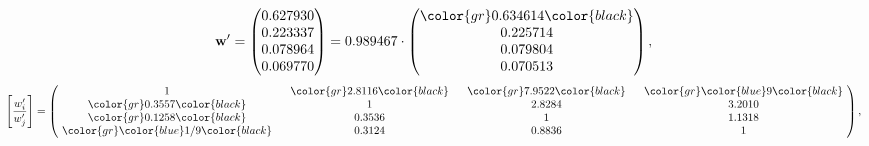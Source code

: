 \begin{example}
\begin{equation*}
\mathbf{w}^{\prime} =
\begin{pmatrix}
0.627930\\
0.223337\\
0.078964\\
0.069770
\end{pmatrix} =
0.989467\cdot
\begin{pmatrix}
\color{gr} 0.634614\color{black} \\
0.225714\\
0.079804\\
0.070513
\end{pmatrix},
\end{equation*}
\begin{equation*}
\left[ \frac{{w}^{\prime}_i}{{w}^{\prime}_j} \right] =
\begin{pmatrix}
$\,\,$ 1 $\,\,$ & $\,\,$\color{gr} 2.8116\color{black} $\,\,$ & $\,\,$\color{gr} 7.9522\color{black} $\,\,$ & $\,\,$\color{gr} \color{blue} 9\color{black} $\,\,$ \\
$\,\,$\color{gr} 0.3557\color{black} $\,\,$ & $\,\,$ 1 $\,\,$ & $\,\,$2.8284$\,\,$ & $\,\,$3.2010  $\,\,$ \\
$\,\,$\color{gr} 0.1258\color{black} $\,\,$ & $\,\,$0.3536$\,\,$ & $\,\,$ 1 $\,\,$ & $\,\,$1.1318 $\,\,$ \\
$\,\,$\color{gr} \color{blue}  1/9\color{black} $\,\,$ & $\,\,$0.3124$\,\,$ & $\,\,$0.8836$\,\,$ & $\,\,$ 1  $\,\,$ \\
\end{pmatrix},
\end{equation*}
\end{example}
\newpage
